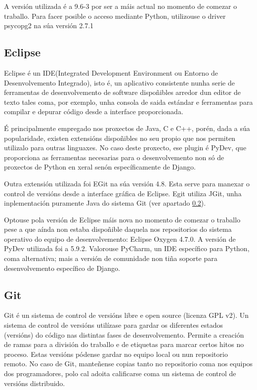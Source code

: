 A versión utilizada é a 9.6-3 por ser a máis actual no momento de comezar o traballo. Para facer posible o acceso mediante Python, utilizouse o driver psycopg2 na súa versión 2.7.1


\subsection{Eclipse}
\label{eclipse}

Eclipse é un IDE(Integrated Development Environment ou Entorno de Desenvolvemento Integrado), isto é, un aplicativo consistente nunha serie de ferramentas de desenvolvemento de software dispoñibles arredor dun editor de texto tales coma, por exemplo, unha consola de saida estándar e ferramentas para compilar e depurar código desde a interface proporcionada.

É principalmente empregado nos proxectos de Java, C e C++, porén, dada a súa popularidade, existen extensións dispoñibles no seu propio  que nos permiten utilizalo para outras linguaxes. No caso deste proxecto, ese plugin é PyDev, que proporciona as ferramentas necesarias para o desenvolvemento non só de proxectos de Python en xeral senón específicamente de Django.

Outra extensión utilizada foi EGit na súa versión 4.8. Esta serve para manexar o control de versións  desde a interface gráfica de Eclipse. Egit utiliza JGit, unha inplementación puramente Java do sistema Git (ver apartado \ref{git}).

Optouse pola versión de Eclipse máis nova no momento de comezar o traballo pese a que aínda non estaba dispoñible daquela nos repositorios do sistema operativo do equipo de desenvolvemento: Eclipse Oxygen 4.7.0. A versión de PyDev utilizada foi a 5.9.2. Valorouse PyCharm, un IDE específico para Python, coma alternativa; mais a versión de comunidade non tiña soporte para desenvolvemento específico de Django\cite{pycharm}.
 


\subsection{Git}
\label{git}

Git é un sistema de control de versións libre e open source (licenza GPL v2). Un sistema de control de versións utilízase para gardar os diferentes estados (versións) do código nas distintas fases de desenvolvemento. Permite a creación de ramas para a división do traballo e de etiquetas para marcar certos hitos no proceso. Estas versións pódense gardar no equipo local ou nun repositorio remoto. No caso de Git, manteñense copias tanto no repositorio coma nos equipos dos programadores, polo cal adoita calificarse coma un sistema de control de versións distribuido\cite{git}.

